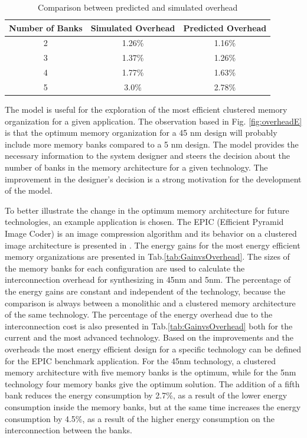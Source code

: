  \begin{center}
	\begin{table}
	\caption{Comparison between predicted and simulated overhead}
	\label{tab:verification}
	\centering
	{
	\begin{tabular}{|c|c|c|}
	\hline
	Number of Banks &	Simulated Overhead & Predicted Overhead \\
	\hline
	2 & 1.26\%  & 1.16\% \\
	\hline 
	3 & 1.37\%  & 1.26\% \\
	\hline 
	4 & 1.77\% & 1.63\% \\
	\hline
	5 & 3.0\% & 2.78\% \\
	\hline	
	\end{tabular}}
	\end{table}
\end{center}
 
The model is useful for the exploration of the most efficient clustered memory organization for a given application. 
The observation based in Fig. \ref{fig:overheadE} is that the optimum memory organization for a 45 nm design will probably include more memory banks compared to a 5 nm design.
The model provides the necessary information to the system designer and steers the decision about the number of banks in the memory architecture for a given technology.
The improvement in the designer's decision is a strong motivation for the development of the model. 

To better illustrate the change in the optimum memory architecture for future technologies, an example application is chosen.
The EPIC (Efficient Pyramid Image Coder)  is an image compression algorithm and its behavior on a clustered image architecture is presented in \cite{filippopoulos2013exploration}.
The energy gains for the most energy efficient memory organizations are presented in Tab.\ref{tab:GainvsOverhead}.
The sizes of the memory banks for each configuration are used to calculate the interconnection overhead for synthesizing in 45nm and 5nm.
The percentage of the energy gains are constant and independent of the technology, because the comparison is always between a monolithic and a clustered memory architecture of the same technology.
The percentage of the energy overhead due to the interconnection cost is also presented in Tab.\ref{tab:GainvsOverhead} both for the current and the most advanced technology.
Based on the improvements and the overheads the most energy efficient design for a specific technology can be defined for the EPIC benchmark application.
For the 45nm technology, a clustered memory architecture with five memory banks is the optimum, while for the 5nm technology four memory banks give the optimum solution.
The addition of a fifth bank reduces the energy consumption by 2.7\%, as a result of the lower energy consumption inside the memory banks, but at the same time increases the energy consumption by 4.5\%, as a result of the higher energy consumption on the interconnection between the banks.

